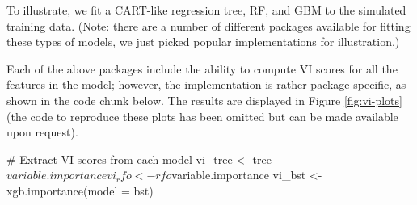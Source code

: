 To illustrate, we fit a CART-like regression tree, RF, and GBM to the
simulated training data. (Note: there are a number of different packages
available for fitting these types of models, we just picked popular
implementations for illustration.)

\begin{Schunk}
\end{Schunk}

Each of the above packages include the ability to compute VI scores for
all the features in the model; however, the implementation is rather
package specific, as shown in the code chunk below. The results are
displayed in Figure \ref{fig:vi-plots} (the code to reproduce these
plots has been omitted but can be made available upon request).

\begin{Schunk}
\begin{Sinput}
# Extract VI scores from each model
vi_tree <- tree$variable.importance
vi_rfo <- rfo$variable.importance
vi_bst <- xgb.importance(model = bst)
\end{Sinput}
\end{Schunk}

